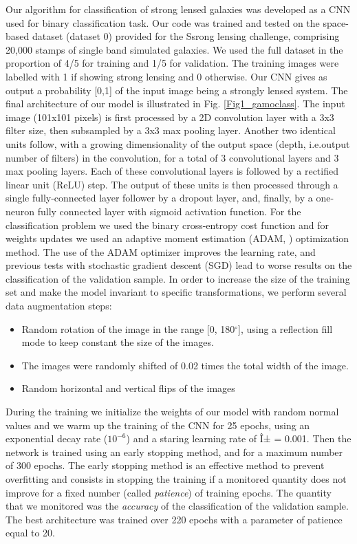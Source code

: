 \documentclass{aa}
\newcommand{\degree}{^{\circ}}
\begin{document}
Our algorithm for classification of strong lensed galaxies was developed as a CNN used for binary classification task.
Our code was trained and tested on the space-based dataset (dataset 0) provided for the Ssrong lensing challenge, comprising 20,000 stamps of single band simulated galaxies. We used the full dataset in the proportion of 4/5 for training and 1/5 for validation. The training images were labelled with 1 if showing strong lensing and 0 otherwise. Our CNN gives as output a probability [0,1] of the input image being a strongly lensed system.
The final architecture of our model is illustrated in Fig. \ref{Fig1_gamoclass}. The input image (101x101 pixels) is first processed by a 2D convolution layer with a 3x3 filter size, then subsampled by a 3x3 max pooling layer.  Another two identical units follow, with a growing dimensionality of the output space (depth, i.e.output number of filters) in the convolution, for a total of 3 convolutional layers and 3 max pooling layers. Each of these convolutional layers is followed by a rectified linear unit (ReLU) step. The output of these units is then processed through a single fully-connected layer follower by a dropout layer, and, finally, by a one-neuron fully connected layer with sigmoid activation function. For the classification problem we used the binary cross-entropy cost function and for weights updates we used an adaptive moment estimation (ADAM, \citealt{Kingma_2014}) optimization method. The use of the ADAM optimizer improves the learning rate, and previous tests with stochastic gradient descent (SGD) lead to worse results on the classification of the validation sample.
In order to increase the size of the training set and make the model invariant to specific transformations, we perform several data augmentation steps:
\begin{itemize}
\item Random rotation of the image in the range [0, 180$\degree$], using a reflection fill mode to keep constant the size of the images.
\item The images were randomly shifted of 0.02 times the total width of the image.
\item Random horizontal and vertical flips of the images
\end{itemize}
During the training we initialize the weights of our model with random normal values and we warm up the training \citet{Huang_2016} of the CNN for 25 epochs, using an exponential decay rate ($10^{-6}$) and a staring learning rate of Î± = 0.001. Then the network is trained using an early stopping method, and for a maximum number of 300 epochs. The early stopping method is an effective method to prevent overfitting and consists in stopping the training if a monitored quantity does not improve for a fixed number (called \textit{patience}) of training epochs. The quantity that we monitored was the \textit{accuracy} of the classification of the validation sample. The best architecture was trained over 220 epochs with a parameter of patience equal to 20.
\end{document}
